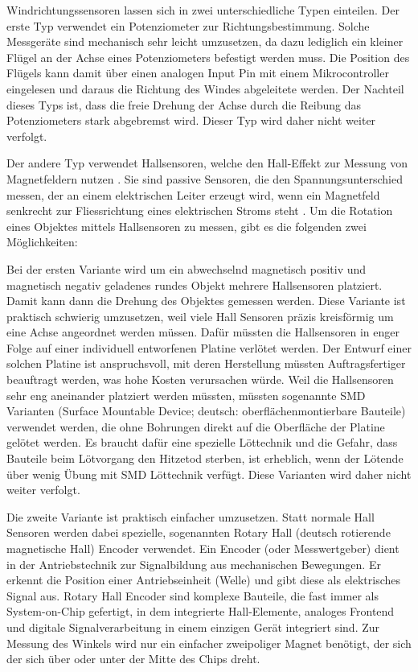 Windrichtungssensoren lassen sich in zwei unterschiedliche Typen einteilen. Der erste Typ verwendet ein Potenziometer zur Richtungsbestimmung. Solche Messgeräte sind mechanisch sehr leicht umzusetzen, da dazu lediglich ein kleiner Flügel an der Achse eines Potenziometers befestigt werden muss. Die Position des Flügels kann damit über einen analogen Input Pin mit einem Mikrocontroller eingelesen und daraus die Richtung des Windes abgeleitete werden. Der Nachteil dieses Typs ist, dass die freie Drehung der Achse durch die Reibung das Potenziometers stark abgebremst wird. Dieser Typ wird daher nicht weiter verfolgt.

Der andere Typ verwendet Hallsensoren, welche den Hall-Effekt zur Messung von 
Magnetfeldern nutzen \cite{noauthor_hall-sensor_2023}. Sie sind passive Sensoren, die den Spannungsunterschied messen, der an einem elektrischen Leiter erzeugt wird, wenn ein Magnetfeld senkrecht zur Fliessrichtung eines elektrischen Stroms steht \cite{noauthor_alles_nodate}. Um die Rotation eines Objektes mittels Hallsensoren zu messen, gibt es die folgenden zwei Möglichkeiten:

Bei der ersten Variante wird um ein abwechselnd magnetisch positiv und magnetisch negativ geladenes rundes Objekt mehrere Hallsensoren platziert. Damit kann dann die Drehung des Objektes gemessen werden. Diese Variante ist praktisch schwierig umzusetzen, weil viele Hall Sensoren präzis kreisförmig um eine Achse angeordnet werden müssen. Dafür müssten die Hallsensoren in enger Folge auf einer individuell entworfenen Platine verlötet werden. Der Entwurf einer solchen Platine ist anspruchsvoll, mit deren Herstellung müssten Auftragsfertiger beauftragt werden, was hohe Kosten verursachen würde. Weil die Hallsensoren sehr eng aneinander platziert werden müssten, müssten sogenannte SMD Varianten (Surface Mountable Device; deutsch: oberflächenmontierbare Bauteile) verwendet werden, die ohne Bohrungen direkt auf die Oberfläche der Platine gelötet werden. Es braucht dafür eine spezielle Löttechnik und die Gefahr, dass Bauteile beim Lötvorgang den Hitzetod sterben, ist erheblich, wenn der Lötende über wenig Übung mit SMD Löttechnik verfügt. Diese Varianten wird daher nicht weiter verfolgt.

Die zweite Variante ist praktisch einfacher umzusetzen. Statt normale Hall Sensoren werden dabei spezielle, sogenannten Rotary Hall (deutsch rotierende magnetische Hall) Encoder verwendet. Ein Encoder (oder Messwertgeber) dient in der Antriebstechnik zur Signalbildung aus mechanischen Bewegungen. Er erkennt die Position einer Antriebseinheit (Welle) und gibt diese als elektrisches Signal aus. \cite{noauthor_was_nodate} Rotary Hall Encoder sind komplexe Bauteile, die fast immer als System-on-Chip gefertigt, in dem integrierte Hall-Elemente, analoges Frontend und digitale Signalverarbeitung in einem einzigen Gerät integriert sind. Zur Messung des Winkels wird nur ein einfacher zweipoliger Magnet benötigt, der sich der sich über oder unter der Mitte des Chips dreht.

